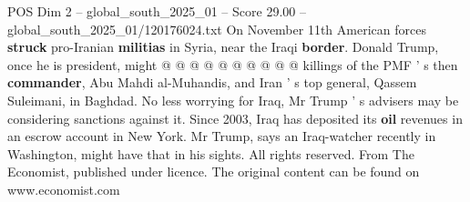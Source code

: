 \begin{textsample}{POS Dim 2 – global\_south\_2025\_01 – Score 29.00 – global\_south\_2025\_01/120176024.txt}
On November 11th American forces \textbf{struck} pro-Iranian \textbf{militias} in Syria, near the Iraqi \textbf{border}.
Donald Trump, once he is president, might @ @ @ @ @ @ @ @ @ @ killings of the PMF ' s then \textbf{commander}, Abu Mahdi al-Muhandis, and Iran ' s top general, Qassem Suleimani, in Baghdad.
No less worrying for Iraq, Mr Trump ' s advisers may be considering sanctions against it.
Since 2003, Iraq has deposited its \textbf{oil} revenues in an escrow account in New York.
Mr Trump, says an Iraq-watcher recently in Washington, might have that in his sights.
All rights reserved.
From The Economist, published under licence.
The original content can be found on www.economist.com

\end{textsample}
